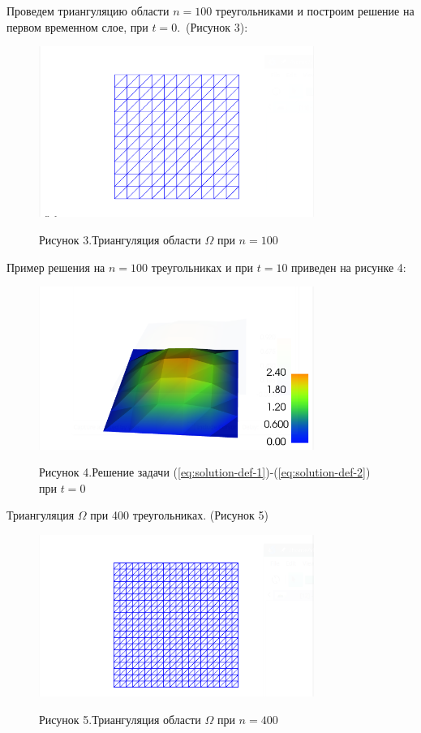 Проведем триангуляцию области $n=100$ треугольниками и построим решение на первом временном слое, при $t=0$.~(Рисунок 3):
\begin{figure}[H]
      \centering
      \includegraphics[width=0.8\textwidth]{plots/n10t10_polygons.png}\\
      \centering\caption*{Рисунок 3.Триангуляция области $\Omega$ при $n=100$}
\end{figure}

Пример решения на $n=100$ треугольниках и при $t=10$ приведен на рисунке 4:
\begin{figure}[H]
      \centering
      \includegraphics[width=0.8\textwidth]{plots/n10t10.png}\\
      \centering\caption*{Рисунок 4.Решение задачи (\ref{eq:solution-def-1})-(\ref{eq:solution-def-2}) при $t=0$}
\end{figure}

Триангуляция $\Omega$ при 400 треугольниках. (Рисунок 5)
\begin{figure}[H]
      \centering
      \includegraphics[width=0.8\textwidth]{plots/n20t0_polygons.png}\\
      \centering\caption*{Рисунок 5.Триангуляция области $\Omega$ при $n=400$}
\end{figure}

